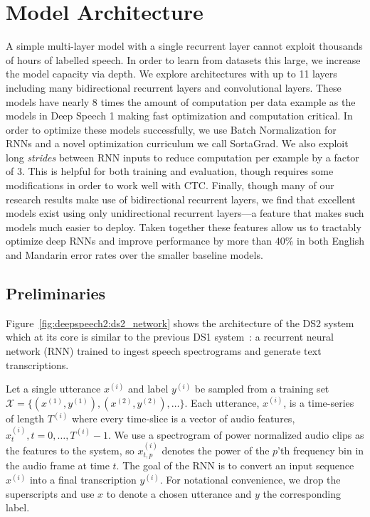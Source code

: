 \section{Model Architecture}
\label{sec:scale_asr:model}

A simple multi-layer model with a single recurrent layer cannot exploit
thousands of hours of labelled speech. In order to learn from datasets this
large, we increase the model capacity via depth. We explore architectures with
up to 11 layers including many bidirectional recurrent layers and convolutional
layers. These models have nearly 8 times the amount of computation per data
example as the models in Deep Speech 1 making fast optimization and computation
critical. In order to optimize these models successfully, we use Batch
Normalization for RNNs and a novel optimization curriculum we call SortaGrad.
We also exploit long \emph{strides} between RNN inputs to reduce computation
per example by a factor of 3. This is helpful for both training and evaluation,
though requires some modifications in order to work well with CTC. Finally,
though many of our research results make use of bidirectional recurrent layers,
we find that excellent models exist using only unidirectional recurrent
layers---a feature that makes such models much easier to deploy.  Taken
together these features allow us to tractably optimize deep RNNs and improve
performance by more than 40\% in both English and Mandarin error rates over the
smaller baseline models.

\subsection{Preliminaries}

Figure~\ref{fig:deepspeech2:ds2_network} shows the architecture of the DS2
system which at its core is similar to the previous DS1
system~\cite{hannun2014deepspeech}: a recurrent neural network (RNN) trained to
ingest speech spectrograms and generate text transcriptions. 

Let a single utterance $x^{(i)}$ and label $y^{(i)}$ be sampled from a training
set $\mathcal{X} = \{(x^{(1)},y^{(1)}),(x^{(2)},y^{(2)}),\ldots\}$. Each
utterance, $x^{(i)}$, is a time-series of length $T^{(i)}$ where every
time-slice is a vector of audio features, $x_t^{(i)},  t=0,\ldots,T^{(i)}-1$.
We use a spectrogram of power normalized audio clips as the features to the
system, so $x^{(i)}_{t,p}$ denotes the power of the $p$'th frequency bin in the
audio frame at time $t$. The goal of the RNN is to convert an input sequence
$x^{(i)}$ into a final transcription $y^{(i)}$. For notational convenience, we
drop the superscripts and use $x$ to denote a chosen utterance and $y$ the
corresponding label.

